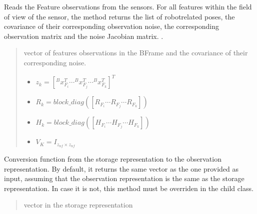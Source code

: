 \documentclass[letterpaper,10pt,english]{sphinxmanual}
\begin{document}
\begin{fulllineitems}
\begin{fulllineitems}
\label{\detokenize{FEKFMBLocalization:MapFeature.MapFeature.GetFeatures}}
\pysigstartsignatures
{}
\pysigstopsignatures
\sphinxAtStartPar
Reads the Feature observations from the sensors. For all features within the field of view of the sensor, the
method returns the list of robot\sphinxhyphen{}related poses, the covariance of their corresponding observation noise, the
corresponding observation matrix and the noise Jacobian matrix.
.
\begin{quote}\begin{description}
\sphinxAtStartPar

\sphinxAtStartPar
vector of features observations in the B\sphinxhyphen{}Frame and the covariance of their corresponding noise.
\begin{itemize}
\item {} 
\sphinxAtStartPar
\(z_k=[^Bx_{F_i}^T \cdots ^Bx_{F_j}^T \cdots ^Bx_{F_k}^T]^T\)

\item {} 
\sphinxAtStartPar
\(R_k=block\_diag([R_{F_i} \cdots R_{F_j} \cdots R_{F_k}])\)

\item {} 
\sphinxAtStartPar
\(H_k=block\_diag([H_{F_i} \cdots H_{F_j} \cdots H_{F_k}])\)

\item {} 
\sphinxAtStartPar
\(V_K=I_{z_{nf} \times z_{nf}}\)

\end{itemize}


\end{description}\end{quote}

\end{fulllineitems}


\begin{fulllineitems}
\label{\detokenize{FEKFMBLocalization:MapFeature.MapFeature.s2o}}
\pysigstartsignatures
{}
\pysigstopsignatures
\sphinxAtStartPar
Conversion function from the storage representation to the observation representation.
By default, it returns the same vector as the one provided as input, assuming that the observation representation is the same as the storage representation.
In case it is not, this method must be overriden in the child class.
\begin{quote}\begin{description}
\sphinxAtStartPar
{} \textendash{} vector in the storage representation


\end{description}
\end{quote}
\end{fulllineitems}
\end{fulllineitems}
\end{document}
